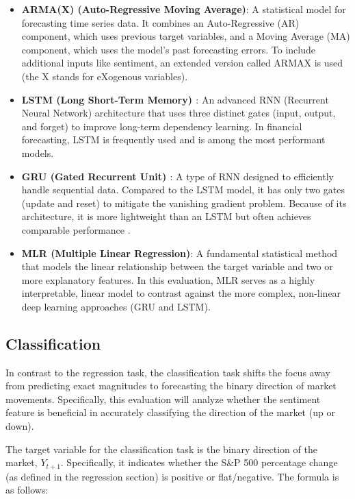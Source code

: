 \documentclass[Master,english,IEEE]{twbook}
\begin{document}
\begin{itemize}
\item \textbf{ARMA(X) (Auto-Regressive Moving Average)}: A statistical model for forecasting time series data. It combines an Auto-Regressive (AR) component, which uses previous target variables, and a Moving Average (MA) component, which uses the model's past forecasting errors. To include additional inputs like sentiment, an extended version called ARMAX is used (the X stands for eXogenous variables).
\item \textbf{LSTM (Long Short-Term Memory) \cite{LSTM_Paper}}: An advanced RNN (Recurrent Neural Network) architecture that uses three distinct gates (input, output, and forget) to improve long-term dependency learning. In financial forecasting, LSTM is frequently used and is among the most performant models. %
\item \textbf{GRU (Gated Recurrent Unit) \cite{gru_compare_paper}}: A type of RNN designed to efficiently handle sequential data. Compared to the LSTM model, it has only two gates (update and reset) to mitigate the vanishing gradient problem. Because of its architecture, it is more lightweight than an LSTM but often achieves comparable performance \cite{gru_compare_paper}.
\item \textbf{MLR (Multiple Linear Regression)}: A fundamental statistical method that models the linear relationship between the target variable and two or more explanatory features. In this evaluation, MLR serves as a highly interpretable, linear model to contrast against the more complex, non-linear deep learning approaches (GRU and LSTM).
\end{itemize}

\subsection{Classification}
In contrast to the regression task, the classification task shifts the focus away from predicting exact magnitudes to forecasting the binary direction of market movements. Specifically, this evaluation will analyze whether the sentiment feature is beneficial in accurately classifying the direction of the market (up or down).

The target variable for the classification task is the binary direction of the market, $Y_{t+1}$. Specifically, it indicates whether the S\&P 500 percentage change (as defined in the regression section) is positive or flat/negative. The formula is as follows:
\end{document}
